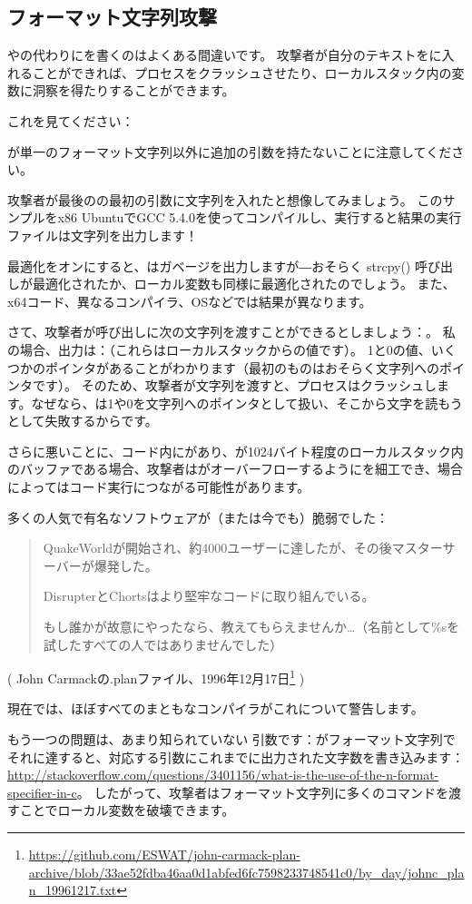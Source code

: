 \subsection{フォーマット文字列攻撃}

やの代わりにを書くのはよくある間違いです。
攻撃者が自分のテキストをに入れることができれば、プロセスをクラッシュさせたり、ローカルスタック内の変数に洞察を得たりすることができます。

これを見てください：



\printf が単一のフォーマット文字列以外に追加の引数を持たないことに注意してください。

攻撃者が最後の\printf の最初の引数に文字列を入れたと想像してみましょう。
このサンプルをx86 UbuntuでGCC 5.4.0を使ってコンパイルし、実行すると結果の実行ファイルは文字列を出力します！

最適化をオンにすると、\printf はガベージを出力しますが―おそらく strcpy() 呼び出しが最適化されたか、ローカル変数も同様に最適化されたのでしょう。
また、x64コード、異なるコンパイラ、\ac{OS}などでは結果が異なります。

さて、攻撃者が\printf 呼び出しに次の文字列を渡すことができるとしましょう：。
私の場合、出力は：（これらはローカルスタックからの値です）。
1と0の値、いくつかのポインタがあることがわかります（最初のものはおそらく文字列へのポインタです）。
そのため、攻撃者が文字列を渡すと、プロセスはクラッシュします。なぜなら、\printf は1や0を文字列へのポインタとして扱い、そこから文字を読もうとして失敗するからです。

さらに悪いことに、コード内にがあり、が1024バイト程度のローカルスタック内のバッファである場合、攻撃者はがオーバーフローするようにを細工でき、場合によってはコード実行につながる可能性があります。

多くの人気で有名なソフトウェアが（または今でも）脆弱でした：

\begin{framed}
\begin{quotation}
QuakeWorldが開始され、約4000ユーザーに達したが、その後マスターサーバーが爆発した。

DisrupterとChortsはより堅牢なコードに取り組んでいる。

もし誰かが故意にやったなら、教えてもらえませんか…（名前として\%sを試したすべての人ではありませんでした）
\end{quotation}
\end{framed}
( John Carmackの.planファイル、1996年12月17日\footnote{\url{https://github.com/ESWAT/john-carmack-plan-archive/blob/33ae52fdba46aa0d1abfed6fc7598233748541c0/by_day/johnc_plan_19961217.txt}} )

現在では、ほぼすべてのまともなコンパイラがこれについて警告します。

もう一つの問題は、あまり知られていない \printf 引数です：\printf がフォーマット文字列でそれに達すると、対応する引数にこれまでに出力された文字数を書き込みます：
\url{http://stackoverflow.com/questions/3401156/what-is-the-use-of-the-n-format-specifier-in-c}。
したがって、攻撃者はフォーマット文字列に多くのコマンドを渡すことでローカル変数を破壊できます。